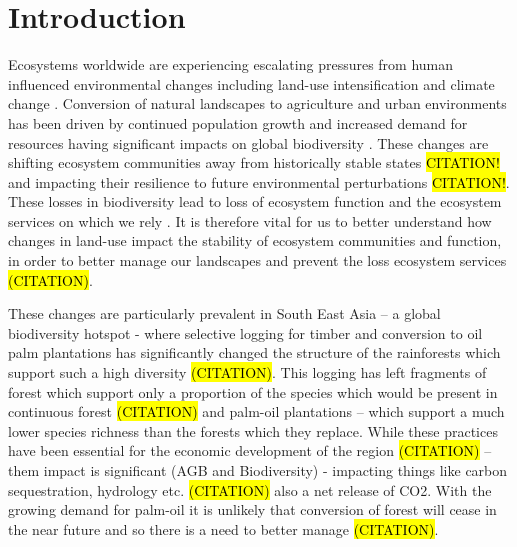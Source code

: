 
\section{Introduction}

Ecosystems worldwide are experiencing escalating pressures from human influenced environmental changes including land-use intensification and climate change \citep{Hautier2015}. Conversion of natural landscapes to agriculture and urban environments has been driven by continued population growth and increased demand for resources \citep{Green2005, Foley2005} having significant impacts on global biodiversity \citep{Pimm1995}. These changes are shifting ecosystem communities away from historically stable states \hl{CITATION!} and impacting their resilience to future environmental perturbations \hl{CITATION!}. These losses in biodiversity lead to loss of ecosystem function and the ecosystem services on which we rely \citep{Diaz2006}. It is therefore vital for us to better understand how changes in land-use impact the stability of ecosystem communities and function, in order to better manage our landscapes and prevent the loss ecosystem services \hl{(CITATION)}. 


These changes are particularly prevalent in South East Asia – a global biodiversity hotspot \citep{DeBruyn2014} - where selective logging for timber and conversion to oil palm plantations has significantly changed the structure of the rainforests which support such a high diversity \hl{(CITATION)}. This logging has left fragments of forest which support only a proportion of the species which would be present in continuous forest \hl{(CITATION)} and palm-oil plantations – which support a much lower species richness than the forests which they replace. While these practices have been essential for the economic development of the region \hl{(CITATION)} – them impact is significant (AGB and Biodiversity) - impacting things like carbon sequestration, hydrology etc. \hl{(CITATION)} also a net release of CO2. With the growing demand for palm-oil it is unlikely that conversion of forest will cease in the near future and so there is a need to better manage \hl{(CITATION)}. 



